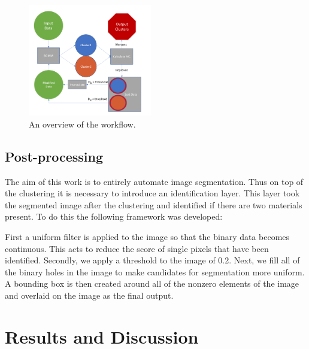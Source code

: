 \documentclass[a4paper,11pt]{article}
\begin{document}
\begin{figure}
  
  \begin{center}
    \includegraphics[width=0.48\textwidth]{figures/algo_flow.png}
  \end{center}
  
    \caption{An overview of the workflow.}
  
  \label{algo_flow}
\end{figure}

\subsection{Post-processing}

The aim of this work is to entirely automate image segmentation. Thus on top of the clustering it is necessary to introduce an identification layer. This layer took the segmented image after the clustering and identified if there are two materials present. To do this the following framework was developed:

First a uniform filter is applied to the image so that the binary data becomes continuous. This acts to reduce the score of single pixels that have been identified. Secondly, we apply a threshold to the image of 0.2. Next, we fill all of the binary holes in the image to make candidates for segmentation more uniform. A bounding box is then created around all of the nonzero elements of the image and overlaid on the image as the final output.





\section{Results and Discussion}
\end{document}
